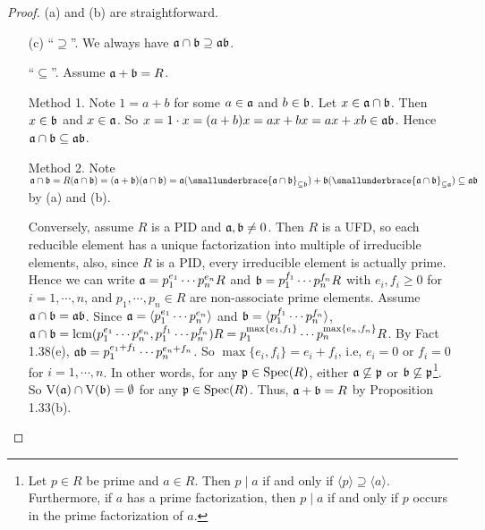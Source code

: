\begin{proof}
    (a) and (b) are straightforward.
    \begin{enumerate}
        \item [(c)]
            ``$\supseteq$''. We always have $\mathfrak{a} \cap \mathfrak{b} \supseteq \mathfrak{a} \mathfrak{b}$. \par 
            ``$\subseteq$''. Assume $\mathfrak{a} + \mathfrak{b} = R$.  \par 
            Method 1. Note $1 = a+b$ for some $a \in \mathfrak{a}$ and $b \in \mathfrak{b}$. Let $x \in \mathfrak{a} \cap \mathfrak{b}$. Then $x \in \mathfrak{b}$ and $x \in \mathfrak{a}$. So $x = 1 \cdot x = (a+b)x = ax + bx = ax + xb \in \operatorname{\mathfrak{a} \mathfrak{b}}$. Hence $\mathfrak{a} \cap \mathfrak{b} \subseteq \mathfrak{a} \mathfrak{b}$. \par 
            Method 2. Note $\ffa \cap \ffb = R(\ffa \cap \ffb) = (\ffa + \ffb)(\ffa \cap \ffb) = \ffa(\smallunderbrace{\ffa \cap \ffb}_{\subseteq \ffb}) + \ffb(\smallunderbrace{\ffa \cap \ffb}_{\subseteq \ffa}) \subseteq \ffa \ffb$ by (a) and (b). \par
            Conversely, assume $R$ is a PID and $\mathfrak{a},\mathfrak{b} \neq 0$. Then $R$ is a UFD, so each reducible element has a unique factorization into multiple of irreducible elements, also, since $R$ is a PID, every irreducible element is actually prime.  Hence we can write $\mathfrak{a} = p_1^{e_1} \cdots p_n^{e_n} R$ and $\mathfrak{b} = p_1^{f_1} \cdots p_n^{f_n}R$ with $e_i,f_i \geq 0$ for $i = 1,\cdots,n$, and $p_1,\cdots,p_n \in R$ are non-associate prime elements. Assume $\mathfrak{a} \cap \mathfrak{b} = \mathfrak{a} \mathfrak{b}$. Since $\mathfrak{a} = \langle p_1^{e_1} \cdots p_n^{e_n} \rangle$ and $\mathfrak{b} = \langle p_1^{f_1} \cdots p_n^{f_n} \rangle$, $\mathfrak{a} \cap \mathfrak{b} = \operatorname{lcm}(p_1^{e_1} \cdots p_n^{e_n},p_1^{f_1} \cdots p_n^{f_n})R = p_1^{\max\{e_1,f_1\}} \cdots p_n^{\max\{e_n,f_n\}}R$. By Fact 1.38(e), $\mathfrak{a}\mathfrak{b} = p_1^{e_1+f_1} \cdots p_n^{e_n+f_n}$. So $\max\{e_i,f_i\} = e_i + f_i$, i.e, $e_i = 0$ or $f_i = 0$ for $i = 1,\cdots,n$. In other words, for any $\mathfrak{p} \in \operatorname{Spec}(R)$, either $\mathfrak{a} \not \subseteq \mathfrak{p}$ or $\mathfrak{b} \not \subseteq \mathfrak{p}$\footnote[2]{Let $p \in R$ be prime and $a \in R$. Then $p \mid a$ if and only if $\langle p \rangle \supseteq \langle a \rangle$. Furthermore, if $a$ has a prime factorization, then $p \mid a$ if and only if $p$ occurs in the prime factorization of $a$.}. So $\operatorname{V}(\mathfrak{a}) \cap \operatorname{V}(\mathfrak{b}) = \emptyset$ for any $\mathfrak{p} \in \operatorname{Spec}(R)$. Thus, $\mathfrak{a} + \mathfrak{b} = R$ by Proposition 1.33(b). \qedhere
    \end{enumerate}
\end{proof}


